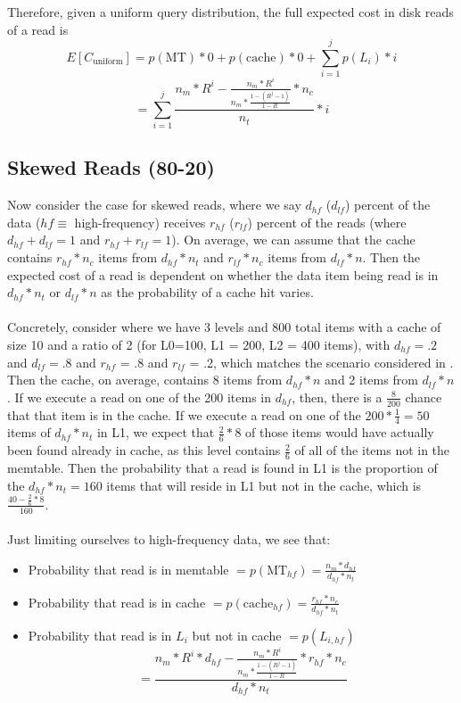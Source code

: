 \documentclass{sig-alternate-05-2015}
\begin{document}
Therefore, given a uniform query distribution, the full expected cost in disk reads of a read is
$$E[C_{\text{uniform}}] = p(\text{MT}) * 0  + p(\text{cache}) * 0 + \sum_{i=1}^j p(L_i) * i$$
$$= \sum_{i=1}^j \frac{n_m * R^i - \frac{n_m * R^i}{n_m * \frac{1-(R^j-1)}{1-R}} * n_c}{n_t}  * i$$

\subsection{Skewed Reads (80-20)}

Now consider the case for skewed reads, where we say $d_{hf}$ ($d_{lf}$) percent of the data ($hf \equiv$ high-frequency) receives $r_{hf}$ ($r_{lf}$) percent of the reads (where $d_{hf} + d_{lf} = 1$ and $r_{hf} + r_{lf} = 1$). On average, we can assume that the cache contains $r_{hf} * n_c$ items from $d_{hf} * n_t$ and $r_{lf} * n_c$ items from $d_{lf} * n$. Then the expected cost of a read is dependent on whether the data item being read is in $d_{hf} * n_t$ or $d_{lf} * n$ as the probability of a cache hit varies.\\ \\
Concretely, consider where we have 3 levels and 800 total items with a cache of size 10 and a ratio of 2  (for L0=100, L1 = 200, L2 = 400 items), with $d_{hf} = .2$ and $d_{lf} = .8$ and $r_{hf}$ = .8 and $r_{lf}$ = .2, which matches the scenario considered in \cite{monkey}. Then the cache, on average, contains 8 items from $d_{hf} * n$ and 2 items from $d_{lf}*n$. If we execute a read on one of the 200 items in $d_{hf}$, then, there is a $\frac{8}{200}$ chance that that item is in the cache. If we execute a read on one of the $200*\frac{1}{4} = 50$ items of  $d_{hf} * n_t$ in L1, we expect that $\frac{2}{6} * 8$ of those items would have actually been found already in cache, as this level contains $\frac{2}{6}$ of all of the items not in the memtable. Then the probability that a read is found in L1 is the proportion of the $d_{hf} * n_t = 160$ items that will reside in L1 but not in the cache, which is $\frac{40 - \frac{2}{6} * 8}{160}$. \\ \\
Just limiting ourselves to high-frequency data, we see that:
\begin{itemize}
  \item Probability that read is in memtable $= p(\text{MT}_{hf}) = \frac{n_m*d_{hf}}{d_{hf} *n_t}$
  \item Probability that read is in cache $= p(\text{cache}_{hf}) = \frac{r_{hf} * n_c}{d_{hf} * n_t}$
  \item Probability that read is in $L_i$ but not in cache $= p(L_{i,hf})$ $$ = \frac{n_m * R^{i}*d_{hf} - \frac{n_m * R^{i}}{n_m * \frac{1-(R^j-1)}{1-R}} * r_{hf} * n_c}{d_{hf} * n_t} $$
\end{itemize}
\end{document}
